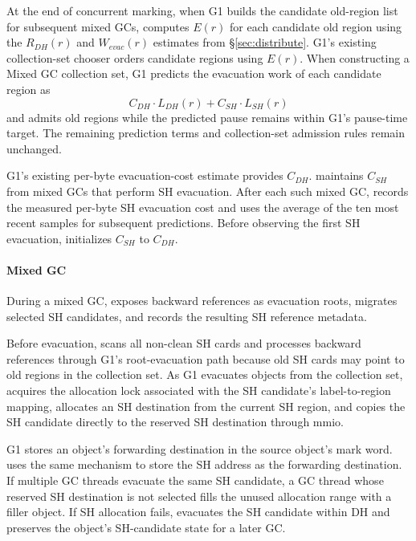At the end of concurrent marking, when G1 builds the candidate old-region list for subsequent mixed GCs, \chipperName{} computes $E(r)$ for each candidate old region using the $R_{DH}(r)$ and $W_{\mathit{evac}}(r)$ estimates from \S\ref{sec:distribute}.
G1's existing collection-set chooser orders candidate regions using $E(r)$.
When constructing a Mixed GC collection set, G1 predicts the evacuation work of each candidate region as
%
\[
	C_{DH} \cdot L_{DH}(r) +
	C_{SH} \cdot L_{SH}(r)
\]
%
and admits old regions while the predicted pause remains within G1's pause-time target.
The remaining prediction terms and collection-set admission rules remain unchanged.

G1's existing per-byte evacuation-cost estimate provides $C_{DH}$.
\chipperName{} maintains $C_{SH}$ from mixed GCs that perform SH evacuation.
After each such mixed GC, \chipperName{} records the measured per-byte SH evacuation cost and uses the average of the ten most recent samples for subsequent predictions.
Before observing the first SH evacuation, \chipperName{} initializes $C_{SH}$ to $C_{DH}$.

\paragraph{\textbf{Mixed GC}}
During a mixed GC, \chipperName{} exposes backward references as evacuation roots, migrates selected SH candidates, and records the resulting SH reference metadata.

Before evacuation, \chipperName{} scans all non-clean SH cards and processes backward references through G1's root-evacuation path because old SH cards may point to old regions in the collection set.
As G1 evacuates objects from the collection set, \chipperName{} acquires the allocation lock associated with the SH candidate's label-to-region mapping, allocates an SH destination from the current SH region, and copies the SH candidate directly to the reserved SH destination through mmio.

G1 stores an object's forwarding destination in the source object's mark word.
\chipperName{} uses the same mechanism to store the SH address as the forwarding destination.
If multiple GC threads evacuate the same SH candidate, a GC thread whose reserved SH destination is not selected fills the unused allocation range with a filler object.
If SH allocation fails, \chipperName{} evacuates the SH candidate within DH and preserves the object's SH-candidate state for a later GC.

